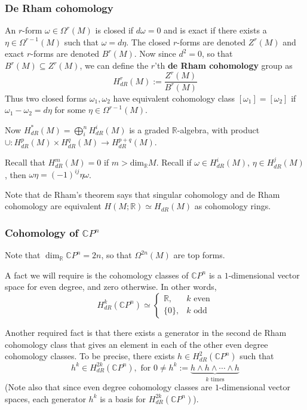\documentclass[a4paper]{article}
\theoremstyle{definition} \newtheorem*{definition}{Definition}
\theoremstyle{definition} \newtheorem*{definitions}{Definitions}
\theoremstyle{plain} \newtheorem{theorem}{Theorem}[section]
\theoremstyle{plain} \newtheorem{proposition}[theorem]{Proposition}
\theoremstyle{plain} \newtheorem{corollary}[theorem]{Corollary}
\theoremstyle{plain} \newtheorem{lemma}[theorem]{Lemma}
\theoremstyle{plain} \newtheorem{example}[theorem]{Example}
\newcommand{\defn}[1]{\textbf{#1}}
\newcommand{\realnos}{\mathbb{R}}
\newcommand{\complexnos}{\mathbb{C}}
\begin{document}
\subsubsection{De Rham cohomology}
An $r$-form $\omega\in \Omega^r(M)$ is closed if $d\omega=0$ and is exact if there exists a $\eta \in \Omega^{r-1}(M)$ such that $\omega = d\eta$. The closed $r$-forms are denoted $Z^r(M)$ and exact $r$-forms are denoted $B^r(M)$. Now since $d^2=0$, so that $B^r(M)\subseteq Z^r(M)$, we can define the $r$'th \defn{de Rham cohomology} group as 
$$H_{dR}^r(M):=\frac{Z^r(M)}{B^r(M)}$$
Thus two closed forms $\omega_1, \omega_2$ have equivalent cohomology class $[\omega_1]=[\omega_2]$ if $\omega_1 - \omega_2 = d\eta$ for some $\eta \in \Omega^{r-1}(M)$. 

Now $H^*_{dR}(M) = \bigoplus_i^n H^i_{dR}(M)$ is a graded $\realnos$-algebra, with product $\cup:H^p_{dR}(M)\times H^q_{dR}(M)\to H^{p+q}_{dR}(M)$. 

Recall that $H^m_{dR}(M)=0$ if $m>\text{dim}_\realnos M$. Recall if $\omega \in H^{i}_{dR}(M)$, $\eta \in H^{j}_{dR}(M)$, then $\omega \eta = (-1)^{ij} \eta \omega$.

Note that de Rham's theorem says that singular cohomology and de Rham cohomology are equivalent $H(M; \realnos)\simeq H_{dR}(M)$ as cohomology rings.

\subsubsection{Cohomology of $\complexnos P^n$}
Note that $\dim_\realnos \complexnos P^n = 2n$, so that $\Omega^{2n}(M)$ are top forms.  

A fact we will require is the cohomology classes of $\complexnos P^n$ is a $1$-dimensional vector space for even degree, and zero otherwise. In other words,
$$H^k_{dR}(\complexnos P^n)\simeq \begin{cases}
\realnos, &  k \text{ even} \\ 
\{0\}, & k \text{ odd}
\end{cases}$$

Another required fact is that there exists a generator in the second de Rham cohomology class that gives an element in each of the other even degree cohomology classes. To be precise, there exists $h\in H^2_{dR}(\complexnos P^n)$ such that 
$$h^k \in H^{2k}_{dR}(\complexnos P^n), \text{ for } 0\neq h^k := \underbrace{h\wedge h \wedge \cdots \wedge h}_{k \text{ times}}$$
(Note also that since even degree cohomology classes are $1$-dimensional vector spaces, each generator $h^k$ is a basis for $H^{2k}_{dR}(\complexnos P^n)$).
\end{document}

